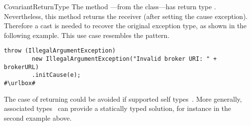 \begin{pattern}{CovariantReturnType}
The  method ---from the  class---has return type .
Nevertheless, this method returns the receiver (after setting the cause exception).
Therefore a cast is needed to recover the original exception type,
as shown in the following example.
This use case resembles the  pattern.

\def\urlvar{http://bit.ly/apache_activemq_2EnSivc}
\begin{verbatim}
throw (IllegalArgumentException)
        new IllegalArgumentException("Invalid broker URI: " + brokerURL)
        .initCause(e);
#\urlbox#
\end{verbatim}


\issues{}
The case of returning  could be avoided if \java{} supported self types~\cite{bruceChallengingTypingIssues2003}.
More generally, associated types~\cite{chakravartyAssociatedTypeSynonyms2005} can provide a statically typed solution,
for instance in the second example above.

\end{pattern}
